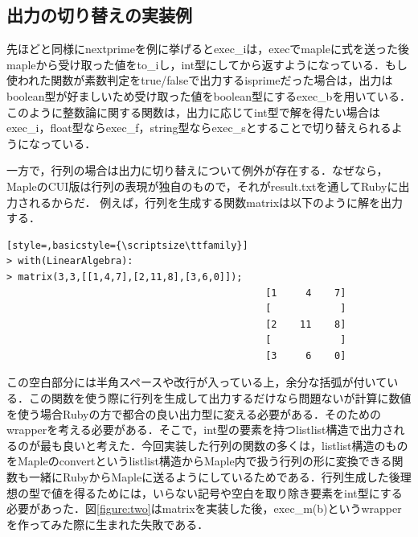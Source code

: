 \subsection{出力の切り替えの実装例}
先ほどと同様にnextprimeを例に挙げるとexec\_iは，execでmapleに式を送った後mapleから受け取った値をto\_iし，int型にしてから返すようになっている．もし使われた関数が素数判定をtrue/falseで出力するisprimeだった場合は，出力はboolean型が好ましいため受け取った値をboolean型にするexec\_bを用いている．このように整数論に関する関数は，出力に応じてint型で解を得たい場合はexec\_i，float型ならexec\_f，string型ならexec\_sとすることで切り替えられるようになっている．

一方で，行列の場合は出力に切り替えについて例外が存在する．なぜなら，MapleのCUI版は行列の表現が独自のもので，それがresult.txtを通してRubyに出力されるからだ．
例えば，行列を生成する関数matrixは以下のように解を出力する．
\begin{lstlisting}[style=,basicstyle={\scriptsize\ttfamily}]
> with(LinearAlgebra):
> matrix(3,3,[[1,4,7],[2,11,8],[3,6,0]]);
                                             [1     4    7]
                                             [            ]
                                             [2    11    8]
                                             [            ]
                                             [3     6    0]
\end{lstlisting}
この空白部分には半角スペースや改行が入っている上，余分な括弧が付いている．この関数を使う際に行列を生成して出力するだけなら問題ないが計算に数値を使う場合Rubyの方で都合の良い出力型に変える必要がある．そのためのwrapperを考える必要がある．そこで，int型の要素を持つlistlist構造で出力されるのが最も良いと考えた．今回実装した行列の関数の多くは，listlist構造のものをMapleのconvertというlistlist構造からMaple内で扱う行列の形に変換できる関数も一緒にRubyからMapleに送るようにしているためである．行列生成した後理想の型で値を得るためには，いらない記号や空白を取り除き要素をint型にする必要があった．図\ref{figure:two}はmatrixを実装した後，exec\_m(b)というwrapperを作ってみた際に生まれた失敗である．
\newpage

